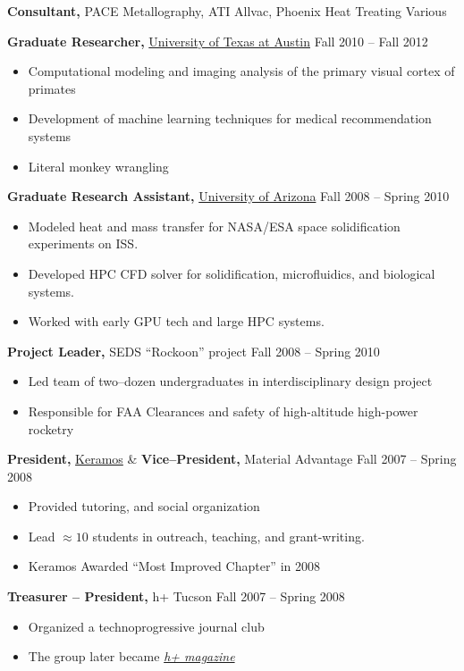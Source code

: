 \documentclass{res}
\begin{document}
\begin{resume}
{\bf Consultant,} PACE Metallography, ATI Allvac, Phoenix Heat Treating \hfill Various

{\bf Graduate Researcher,} \href{https://www.utexas.edu/}{University of Texas at Austin} \hfill
Fall 2010 -- Fall 2012
\begin{itemize} \itemsep -2pt
  \item Computational modeling and imaging analysis of the primary visual cortex of primates
  \item Development of machine learning techniques for medical recommendation systems
  \item Literal monkey wrangling
\end{itemize}

{\bf Graduate Research Assistant,} \href{https://www.arizona.edu/}{University of Arizona} \hfill
Fall 2008 -- Spring 2010
\begin{itemize} \itemsep -2pt
  \item Modeled heat and mass transfer for NASA/ESA space solidification experiments on ISS.
  \item Developed HPC CFD solver for solidification, microfluidics, and biological systems.
  \item Worked with early GPU tech and large HPC systems.
\end{itemize}

{\bf Project Leader,}  SEDS ``Rockoon''  project \hfill   Fall 2008 -- Spring 2010
\begin{itemize} \itemsep -2pt
  \item Led team of two--dozen undergraduates in interdisciplinary design project
  \item Responsible for FAA Clearances and safety of high-altitude high-power rocketry
\end{itemize}

{\bf President,} \href{https://ceramics.org/members/member-communities/classes/keramos}{Keramos} \& {\bf Vice--President,} Material Advantage \hfill Fall 2007 -- Spring 2008
\begin{itemize} \itemsep -2pt
  \item Provided tutoring, and social organization
  \item Lead $\approx10$ students in outreach, teaching, and grant-writing.
  \item Keramos Awarded ``Most Improved Chapter'' in 2008
\end{itemize}

{\bf Treasurer -- President,} h+ Tucson \hfill Fall 2007 -- Spring 2008
\begin{itemize} \itemsep -2pt
  \item Organized a technoprogressive journal club
  \item The group later became \href{http://hplusmagazine.com/}{\textit{h+ magazine}}
\end{itemize}


\end{resume}
\end{document}
